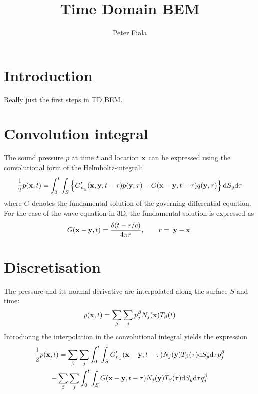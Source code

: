 \documentclass[a4paper,11pt,twoside]{article}
\title{Time Domain BEM}
\author{Peter Fiala}
\newcommand{\td}{\mathrm{d}}
\begin{document}
\maketitle

\tableofcontents

\section{Introduction}

Really just the first steps in TD BEM.

\section{Convolution integral}

The sound pressure $p$ at time $t$ and location ${\bf x}$ can be expressed using the convolutional form of the Helmholtz-integral:
%
\begin{equation}
\frac{1}{2}p({\bf x}, t) =
\int_{0}^{t}
\int_{S}
\left\{
G'_{n_y}({\bf x},{\bf y}, t-\tau) p({\bf y}, \tau)
-
G({\bf x}-{\bf y}, t-\tau) q({\bf y}, \tau)
\right\}
\td S_{y}
\td \tau
\end{equation}
%
where $G$ denotes the fundamental solution of the governing differential equation. For the case of the wave equation in 3D, the fundamental solution is expressed as
%
\begin{equation}
G({\bf x}-{\bf y}, t) = \frac{\delta(t-r/c)}{4\pi r}, \qquad r = |{\bf y}-{\bf x}|
\end{equation}

\section{Discretisation}

The pressure and its normal derivative are interpolated along the surface $S$ and time:
%
\begin{equation}
p({\bf x}, t) =
\sum_{\beta} \sum_j
p^{\beta}_{j} N_j({\bf x}) T_{\beta}(t)
\end{equation}
%
Introducing the interpolation in the convolutional integral yields the expression
%
\begin{multline}
\frac{1}{2}p({\bf x}, t) =
\sum_{\beta} \sum_j 
\int_{0}^{t} \int_{S}
G'_{n_y}({\bf x}-{\bf y}, t-\tau)
N_j({\bf y}) T_{\beta}(\tau)
\td S_{y} \td \tau
p^{\beta}_{j} \\
-
\sum_{\beta} \sum_j 
\int_{0}^{t} \int_{S}
G({\bf x}-{\bf y}, t-\tau)
N_j({\bf y}) T_{\beta}(\tau)
\td S_{y} \td \tau
q^{\beta}_{j} 
\end{multline}
\end{document}
